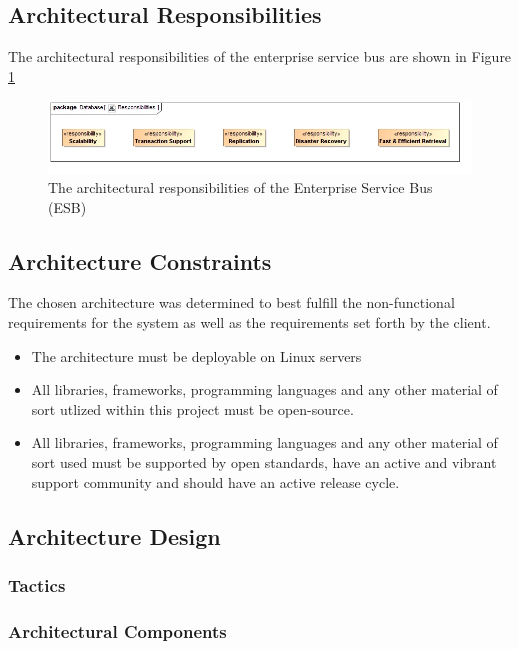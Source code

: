 \subsection{Architectural Responsibilities}
The architectural responsibilities of the enterprise service bus are shown in 
Figure \ref{fig:ESBResponsibilities}
\begin{figure}[H]
	\begin{center}
	\includegraphics[scale=0.5]{../Diagrams and Charts/Database/Responsibilities.jpg}
	\caption{The architectural responsibilities of the Enterprise Service Bus (ESB)}
	\label{fig:ESBResponsibilities}
	\end{center}
\end{figure}

\subsection{Architecture Constraints}

\label{sec:systemArchitecturalConstraints}
The chosen architecture was determined to best fulfill the non-functional
requirements for the system as well as the requirements set forth by the
client.
\begin{itemize}
	\item The architecture must be deployable on Linux servers
	\item All libraries, frameworks, programming languages and any other
	material of sort utlized within this project must be open-source.
	\item All libraries, frameworks, programming languages and any other
	material of sort used must be supported by open standards, have an 
	active and vibrant support community and should have an active 
	release cycle. 	
\end{itemize}

\subsection{Architecture Design}
\subsubsection{Tactics}
\subsubsection{Architectural Components}
